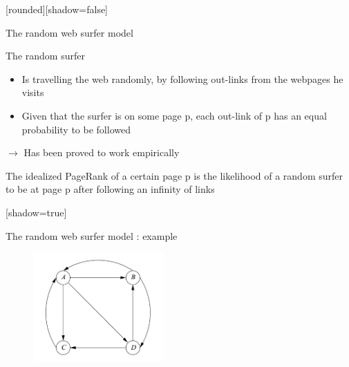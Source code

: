 \documentclass[10pt]{beamer}
\begin{document}
[rounded][shadow=false]
\begin{frame}[allowframebreaks]{The random web surfer model}
  \begin{block}{The random surfer}
    \begin{itemize}
      \item Is travelling the web randomly, by following out-links from the webpages he visits
      \item Given that the surfer is on some page p, each out-link of p has an equal probability to be followed  
    \end{itemize}
    $\rightarrow$ Has been proved to work empirically
  \end{block}
  \begin{definition}
  The idealized PageRank of a certain page p is the likelihood of a random surfer to be at page p after following an infinity of links
  
  \end{definition}
\end{frame}

[shadow=true]
\begin{frame}{The random web surfer model : example}
      \begin{figure}
      \centering
        \includegraphics[width = 5cm]{graph1.png}
      \end{figure}
\end{frame}
\end{document}
